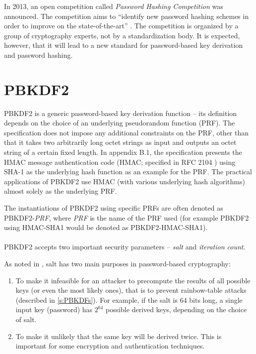 \documentclass[12pt,oneside]{fithesis2}
\begin{document}
      \label{p:phc}
      In 2013, an open competition called \emph{Password Hashing Competition} was announced. The competition aims to ``identify new password hashing schemes in order to improve on the state-of-the-art'' \cite{phc}. The competition is organized by a group of cryptography experts, not by a standardization body. It is expected, however, that it will lead to a new standard for password-based key derivation and password hashing.
      
      \section{PBKDF2}\label{s:PBKDF2}
      PBKDF2 is a generic password-based key derivation function -- its definition depends on the choice of an underlying pseudorandom function (PRF). The specification \cite{rfc2898} does not impose any additional constraints on the PRF, other than that it takes two arbitrarily long octet strings as input and outputs an octet string of a certain fixed length. In appendix B.1, the specification presents the HMAC message authentication code (HMAC; specified in RFC 2104 \cite{rfc2104}) using SHA-1 as the underlying hash function as an example for the PRF. The practical applications of PBKDF2 use HMAC (with various underlying hash algorithms) almost solely as the underlying PRF.
      
      The instantiations of PBKDF2 using specific PRFs are often denoted as PBKDF2-\emph{PRF}, where \emph{PRF} is the name of the PRF used (for example PBKDF2 using HMAC-SHA1 would be denoted as PBKDF2-HMAC-SHA1).
      
      \paragraph*{}
      PBKDF2 accepts two important security parameters -- \emph{salt} and \emph{iteration count}.
      
      As noted in \cite[section 4.1]{rfc2898}, salt has two main purposes in password-based cryptography:
      \begin{enumerate}
        \item To make it infeasible for an attacker to precompute the results of all possible keys (or even the most likely ones), that is to prevent rainbow-table attacks (described in \ref{s:PBKDFs}). For example, if the salt is 64 bits long, a single input key (password) has $2^{64}$ possible derived keys, depending on the choice of salt.
        \item To make it unlikely that the same key will be derived twice. This is important for some encryption and authentication techniques.
      \end{enumerate}
      
\end{document}

